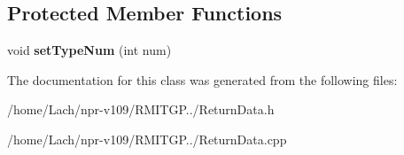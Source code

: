 \subsection*{Protected Member Functions}
\begin{DoxyCompactItemize}
\item 
\hypertarget{classReturnData_a7cee6b7b913045fe03ad0444b09bd3f7}{}\label{classReturnData_a7cee6b7b913045fe03ad0444b09bd3f7} 
void {\bfseries set\+Type\+Num} (int num)
\end{DoxyCompactItemize}


The documentation for this class was generated from the following files\+:\begin{DoxyCompactItemize}
\item 
/home/\+Lach/npr-\/v109/\+R\+M\+I\+T\+G\+P../Return\+Data.\+h\item 
/home/\+Lach/npr-\/v109/\+R\+M\+I\+T\+G\+P../Return\+Data.\+cpp\end{DoxyCompactItemize}
